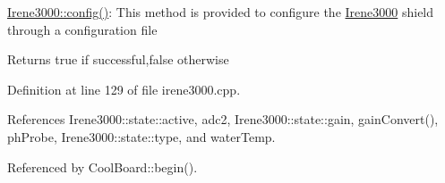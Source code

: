 \hyperlink{classIrene3000_afed5c35e4b23963c157847ef27c11e9c}{Irene3000\+::config()}\+: This method is provided to configure the \hyperlink{classIrene3000}{Irene3000} shield through a configuration file

\begin{DoxyReturn}{Returns}
true if successful,false otherwise 
\end{DoxyReturn}


Definition at line 129 of file irene3000.\+cpp.



References Irene3000\+::state\+::active, adc2, Irene3000\+::state\+::gain, gain\+Convert(), ph\+Probe, Irene3000\+::state\+::type, and water\+Temp.



Referenced by Cool\+Board\+::begin().



